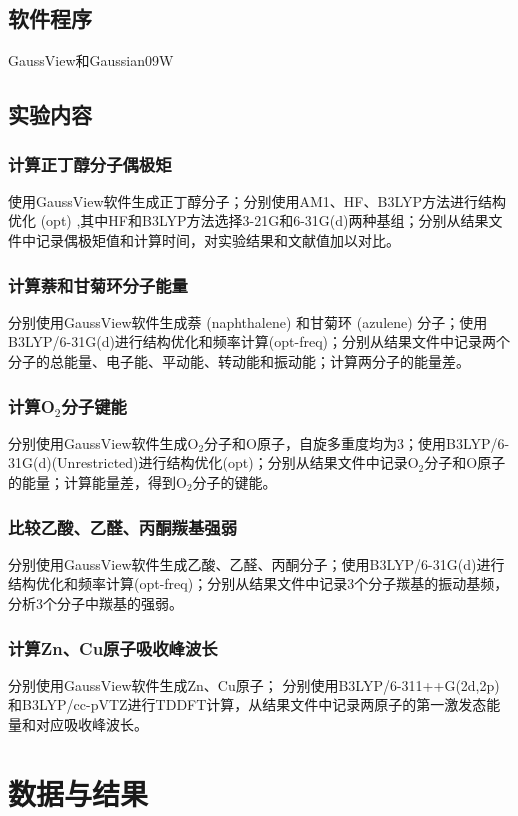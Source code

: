 \documentclass[12pt]{article}
\begin{document}
    	\subsection{软件程序}
    	GaussView和Gaussian09W
    	
    	 \subsection{实验内容}
			\subsubsection{计算正丁醇分子偶极矩}
			使用GaussView软件生成正丁醇分子；分别使用AM1、HF、B3LYP方法进行结构优化 (opt) ,其中HF和B3LYP方法选择3-21G和6-31G(d)两种基组；分别从结果文件中记录偶极矩值和计算时间，对实验结果和文献值加以对比。
			\subsubsection{计算萘和甘菊环分子能量}
			分别使用GaussView软件生成萘 (naphthalene) 和甘菊环 (azulene) 分子；使用B3LYP/6-31G(d)进行结构优化和频率计算(opt-freq)；分别从结果文件中记录两个分子的总能量、电子能、平动能、转动能和振动能；计算两分子的能量差。
			\subsubsection{计算O$_{2}$分子键能}
			分别使用GaussView软件生成O$_{2}$分子和O原子，自旋多重度均为3；使用B3LYP/6-31G(d)(Unrestricted)进行结构优化(opt)；分别从结果文件中记录O$_{2}$分子和O原子的能量；计算能量差，得到O$_{2}$分子的键能。
			\subsubsection{比较乙酸、乙醛、丙酮羰基强弱}
			分别使用GaussView软件生成乙酸、乙醛、丙酮分子；使用B3LYP/6-31G(d)进行结构优化和频率计算(opt-freq)；分别从结果文件中记录3个分子羰基的振动基频，分析3个分子中羰基的强弱。
			\subsubsection{计算Zn、Cu原子吸收峰波长}
			分别使用GaussView软件生成Zn、Cu原子； 分别使用B3LYP/6-311++G(2d,2p)和B3LYP/cc-pVTZ进行TDDFT计算，从结果文件中记录两原子的第一激发态能量和对应吸收峰波长。
    	
\vbox{}  
	 \section{数据与结果}
\end{document}
